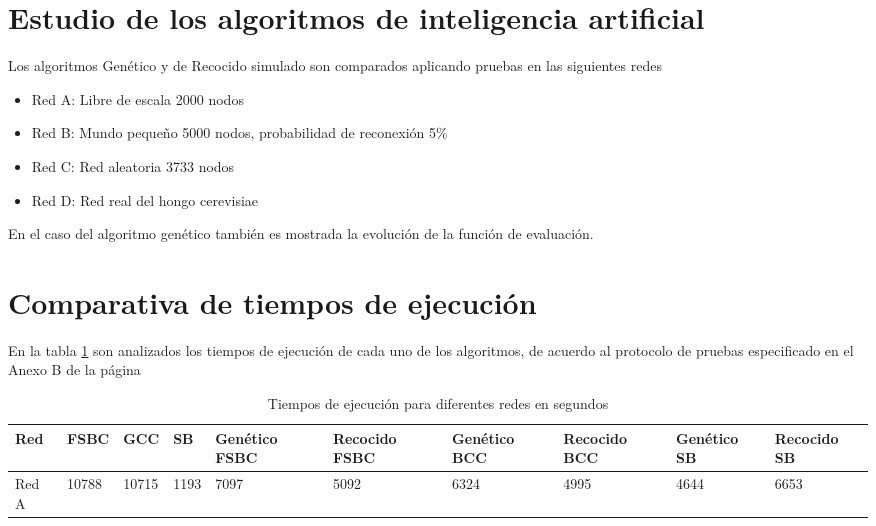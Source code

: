 \section{Estudio de los algoritmos de inteligencia artificial}

Los algoritmos Genético y de Recocido simulado son comparados aplicando pruebas en las siguientes redes

\begin{itemize}
    \item Red A: Libre de escala 2000 nodos
    \item Red B: Mundo pequeño 5000 nodos, probabilidad de reconexión 5\%
    \item Red C: Red aleatoria 3733 nodos
    \item Red D: Red real del hongo cerevisiae
\end{itemize}

En el caso del algoritmo genético también es mostrada la evolución de la función de evaluación.

\section{Comparativa de tiempos de ejecución}

En la tabla \ref{tab:executionTimes} son analizados los tiempos de ejecución de cada uno de los algoritmos, de acuerdo al protocolo de pruebas especificado en el Anexo B de la página \pageref{AnexoB}

\begin{table}[H]
    \centering
    \begin{tabular}{|p{1cm}|p{1cm}|p{1.1cm}|p{1cm}|p{1.5cm}|p{1.5cm}|p{1.5cm}|p{1.5cm}|p{1.5cm}|p{1.5cm}|}
         \hline
         \textbf{Red} & \textbf{FSBC} & \textbf{GCC} & \textbf{SB} & \textbf{Genético FSBC} & \textbf{Recocido FSBC} &
         \textbf{Genético BCC} & \textbf{Recocido BCC} &
         \textbf{Genético SB} & \textbf{Recocido SB} \\
         \hline
         Red A & 10788 & 10715 & 1193 & 7097 & 5092 & 6324 & 4995 &4644 & 6653 \\
         \hline
    \end{tabular}
    \caption{Tiempos de ejecución para diferentes redes en segundos}
    \label{tab:executionTimes}
\end{table}